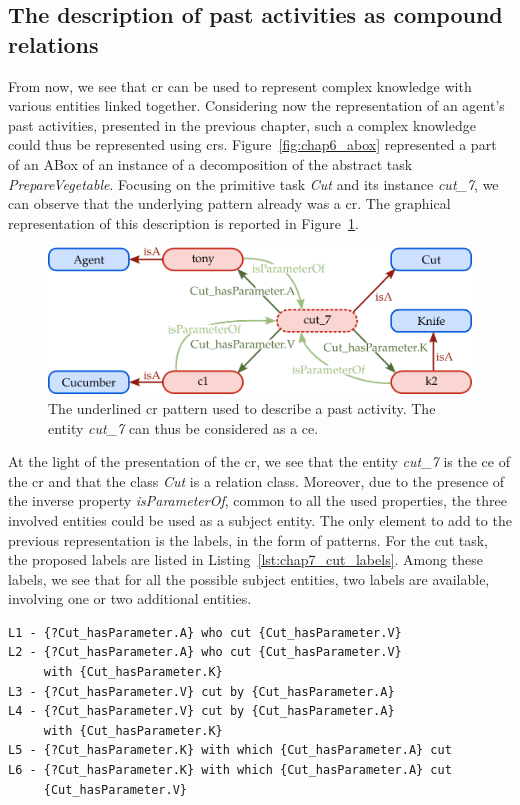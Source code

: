 \subsection{The description of past activities as compound relations}

From now, we see that \acrlong{cr} can be used to represent complex knowledge with various entities linked together. Considering now the representation of an agent's past activities, presented in the previous chapter, such a complex knowledge could thus be represented using \acrshort{cr}s. Figure~\ref{fig:chap6_abox} represented a part of an ABox of an instance of a decomposition of the abstract task \textit{PrepareVegetable}. Focusing on the primitive task \textit{Cut} and its instance \textit{cut\_7}, we can observe that the underlying pattern already was a \acrshort{cr}. The graphical representation of this description is reported in Figure~\ref{fig:chap7_cut7}.

\begin{figure}[ht!]
\centering
\includegraphics[scale=0.4]{figures/chapter7/cut7.png}
\caption{\label{fig:chap7_cut7} The underlined \acrlong{cr} pattern used to describe a past activity. The entity \textit{cut\_7} can thus be considered as a \acrlong{ce}. }
\end{figure}

At the light of the presentation of the \acrshort{cr}, we see that the entity \textit{cut\_7} is the \acrlong{ce} of the \acrlong{cr} and that the class \textit{Cut} is a relation class. Moreover, due to the presence of the inverse property \textit{isParameterOf}, common to all the used properties, the three involved entities could be used as a subject entity. The only element to add to the previous representation is the labels, in the form of patterns. For the cut task, the proposed labels are listed in Listing~\ref{lst:chap7_cut_labels}. Among these labels, we see that for all the possible subject entities, two labels are available, involving one or two additional entities.

\begin{lstlisting}[frame=single, caption={ The set of labels usable to describe the compound relation representing an instance of a cut primitive task.}, label={lst:chap7_cut_labels}, captionpos=b, style=Labels, mathescape=true]
L1 - {?Cut_hasParameter.A} who cut {Cut_hasParameter.V}
L2 - {?Cut_hasParameter.A} who cut {Cut_hasParameter.V} 
     with {Cut_hasParameter.K}
L3 - {?Cut_hasParameter.V} cut by {Cut_hasParameter.A}
L4 - {?Cut_hasParameter.V} cut by {Cut_hasParameter.A} 
     with {Cut_hasParameter.K}
L5 - {?Cut_hasParameter.K} with which {Cut_hasParameter.A} cut
L6 - {?Cut_hasParameter.K} with which {Cut_hasParameter.A} cut 
     {Cut_hasParameter.V}
\end{lstlisting}

